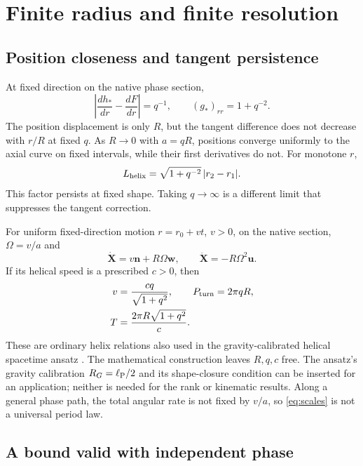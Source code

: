 \documentclass[11pt]{article}
\newcommand{\n}{\bm n}
\newcommand{\uu}{\bm u}
\newcommand{\ww}{\bm w}
\begin{document}
\section{Finite radius and finite resolution}

\subsection{Position closeness and tangent persistence}

At fixed direction on the native phase section,
\begin{equation}
 \left|\frac{dh_*}{dr}-\frac{dF}{dr}\right|=q^{-1},
 \qquad (g_*)_{rr}=1+q^{-2}.
 \label{eq:nonuniform}
\end{equation}
The position displacement is only $R$, but the tangent difference does not decrease with $r/R$ at fixed $q$. As $R\to0$ with $a=qR$, positions converge uniformly to the axial curve on fixed intervals, while their first derivatives do not. For monotone $r$,
\begin{equation}
 L_{\rm helix}=\sqrt{1+q^{-2}}\,|r_2-r_1|.
\end{equation}
This factor persists at fixed shape. Taking $q\to\infty$ is a different limit that suppresses the tangent correction.

For uniform fixed-direction motion $r=r_0+vt$, $v>0$, on the native section, $\Omega=v/a$ and
\begin{equation}
 \dot{\bm X}=v\n+R\Omega\ww,\qquad
 \ddot{\bm X}=-R\Omega^2\uu.
\end{equation}
If its helical speed is a prescribed $c>0$, then
\begin{equation}
 \begin{aligned}
 v&=\frac{cq}{\sqrt{1+q^2}},\qquad P_{\rm turn}=2\pi qR,\\
 T&=\frac{2\pi R\sqrt{1+q^2}}{c}.
 \end{aligned}
 \label{eq:scales}
\end{equation}
These are ordinary helix relations also used in the gravity-calibrated helical spacetime ansatz \cite{WuHelix}. The mathematical construction leaves $R,q,c$ free. The ansatz's gravity calibration $R_G=\ell_{\rm P}/2$ and its shape-closure condition can be inserted for an application; neither is needed for the rank or kinematic results. Along a general phase path, the total angular rate is not fixed by $v/a$, so \eqref{eq:scales} is not a universal period law.

\subsection{A bound valid with independent phase}
\end{document}

